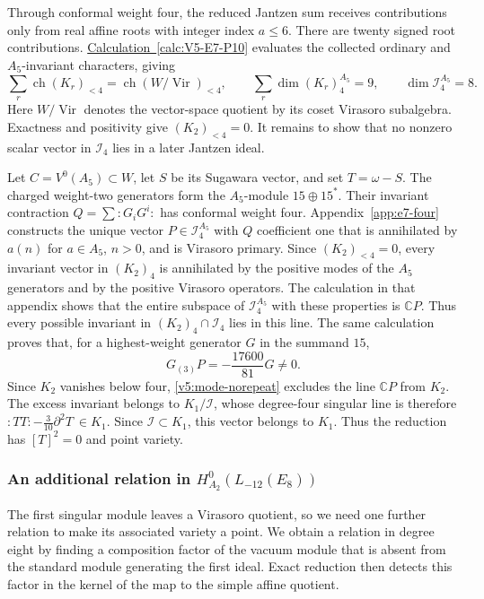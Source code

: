 \documentclass[11pt,a4paper]{amsart}
\numberwithin{equation}{section}
\theoremstyle{definition}
\theoremstyle{remark}
\newcommand{\C}{\mathbb C}
\newcommand{\Vir}{\operatorname{Vir}}
\newcommand{\ch}{\operatorname{ch}}
\begin{document}
Through conformal weight four, the reduced Jantzen sum receives
contributions only from real affine roots with integer index
$a\le6$. There are twenty signed root contributions. \hyperref[calc:V5-E7-P10]{Calculation~\ref*{calc:V5-E7-P10}} evaluates the collected
ordinary and $A_5$-invariant characters, giving
$$
 \sum_r\ch(K_r)_{<4}=\ch(W/\Vir)_{<4},\qquad
 \sum_r\dim(K_r)_4^{A_5}=9,\qquad\dim \mathcal I_4^{A_5}=8.
$$
Here $W/\Vir$ denotes the vector-space quotient by its coset Virasoro
subalgebra. Exactness and positivity give $(K_2)_{<4}=0$.
It remains to show that no nonzero scalar vector in $\mathcal I_4$ lies in a later Jantzen ideal.

Let $C=V^0(A_5)\subset W$, let $S$ be its Sugawara vector,
and set $T=\omega-S$. The charged weight-two generators form the
$A_5$-module $15\oplus15^*$. Their invariant contraction
$Q=\sum:G_iG^i:$ has conformal weight four.
Appendix~\ref{app:e7-four} constructs the unique vector
$P\in \mathcal I_4^{A_5}$ with $Q$ coefficient one that is annihilated by
$a(n)$ for $a\in A_5$, $n>0$, and is Virasoro primary.
Since $(K_2)_{<4}=0$, every invariant vector in $(K_2)_4$
is annihilated by the positive modes of the $A_5$ generators and
by the positive Virasoro operators. The calculation in that appendix
shows that the entire subspace of $\mathcal I_4^{A_5}$ with these
properties is $\C P$. Thus every possible invariant in
$(K_2)_4\cap\mathcal I_4$ lies in this line.
The same calculation proves that, for a highest-weight generator
$G$ in the summand $15$,
\begin{equation}\label{v5:e7-detection}
 G_{(3)}P=-\frac{17600}{81}G\ne0.
\end{equation}
Since $K_2$ vanishes below four, \cref{v5:mode-norepeat}
excludes the line $\C P$ from $K_2$. The excess invariant belongs to
$K_1/\mathcal I$, whose degree-four singular line is therefore
$
             :TT:-\tfrac3{10}\partial^2T\ \in K_1.
$
Since $\mathcal I\subset K_1$, this vector belongs to $K_1$.
Thus the reduction has $[T]^2=0$ and point variety.

\subsubsection{\texorpdfstring{An additional relation in $H^0_{A_2}(L_{-12}(E_8))$}{An additional relation in the A2 reduction of L-12(E8)}}
The first singular module leaves a Virasoro quotient, so we need
one further relation to make its associated variety a point. We obtain
a relation in degree eight by finding a composition factor of the
vacuum module that is absent from the standard module generating the
first ideal. Exact reduction then detects this factor in the kernel
of the map to the simple affine quotient.
\end{document}

